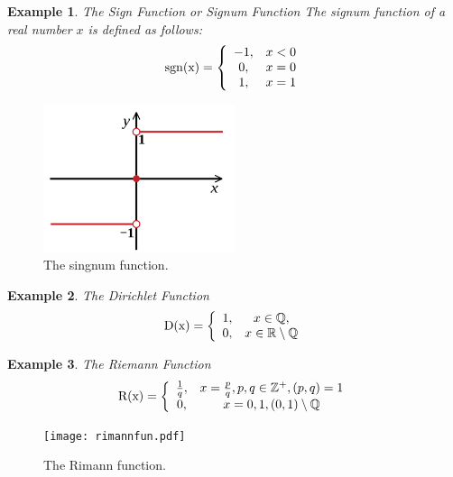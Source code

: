 \documentclass[a4paper,12pt]{article} %
\newtheorem{example}{Example}[section]
\begin{document}
\begin{example}{The Sign Function or Signum Function}
    The signum function of a real number $x$ is defined as 
    follows:
    \[
        \rm{sgn} (x) = \left\{\begin{array}{cc} 
                   -1,  & x < 0\\
                    0,  & x = 0\\
                    1,  & x = 1
        \end{array}\right.
        \]
\end{example}

\begin{figure}[h!]
    \centering
    \includegraphics[width=0.5\textwidth]{signumfun.png}
    \caption{The singnum function.}
    \label{fig:singnum}
\end{figure}

\begin{example}{The Dirichlet Function}
    \[
        \rm D(x) = \left\{\begin{array}{cc} 
            1, & x \in \mathbb{Q},\\
            0, & x \in \mathbb{R} \setminus \mathbb{Q}
        \end{array}\right.
        \]
\end{example}

\begin{example}{The Riemann Function}
    \[
        \rm R(x) = \left\{ \begin{array}{cc} 
            \frac{1}{q}, & x = \frac{p}{q}, p, q \in \mathbb{Z}^+, (p, q) = 1\\
                   0,    & x = 0, 1, (0,1) \setminus \mathbb{Q}
        \end{array}\right.
        \]
\end{example}
\begin{figure}[h!]
    \centering
    \texttt{[image: rimannfun.pdf]}
    \caption{The Rimann function.}
    \label{fig:rimann}
\end{figure}
\end{document}
